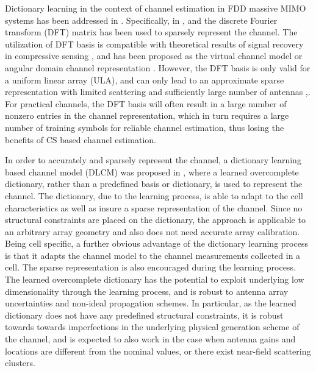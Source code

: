 Dictionary learning in the context of channel estimation in FDD massive MIMO systems has been addressed in \cite{CE_FDD:journals/corr/DingR16}. Specifically, in \cite{CE_FDD_REF4}, \cite{CE_FDD_REF6} and \cite{CE_FDD_REF_9} the discrete Fourier transform (DFT) matrix has been used to
sparsely represent the channel. The utilization of DFT basis is compatible with
theoretical results of signal recovery in compressive sensing \cite{CE_FDD_REF_7}, and has been proposed as the
virtual channel model  \cite{CE_FDD_REF_10} or angular domain channel representation  \cite{CE_FDD_REF_11}. However, the DFT
basis is only valid for a uniform linear array (ULA), and can only lead to an approximate sparse
representation with limited scattering and sufficiently large number of antennas  \cite{CE_FDD_REF_9},\cite{CE_FDD_REF_10}. For
practical channels, the DFT basis will often result in a large number of nonzero entries in the
channel representation, which in turn requires a large number of training symbols for reliable
channel estimation, thus losing the benefits of CS based channel estimation.

In order to accurately and sparsely
represent the channel, a dictionary learning based channel model (DLCM) was proposed in \cite{CE_FDD:journals/corr/DingR16}, where a
learned overcomplete dictionary, rather than a predefined basis or dictionary, is used to represent
the channel. The dictionary, due to the learning process, is able to adapt to the cell characteristics
as well as insure a sparse representation of the channel. Since no structural constraints are placed
on the dictionary, the approach is applicable to an arbitrary array geometry and also does not need
accurate array calibration. Being cell specific, a further obvious advantage of the dictionary learning process is that it adapts the channel model to the 
channel measurements collected in a cell. The
sparse representation is also encouraged during the learning process. The learned overcomplete dictionary has the
potential to exploit underlying low dimensionality through the learning process, and is robust
to antenna array uncertainties and non-ideal propagation schemes. In particular, as the learned dictionary does not have any predefined
structural constraints, it is robust towards towards imperfections in the underlying physical generation scheme of the channel, and is expected to also work in the case when antenna gains and locations are different from the nominal values, or there exist near-field
scattering clusters.  

